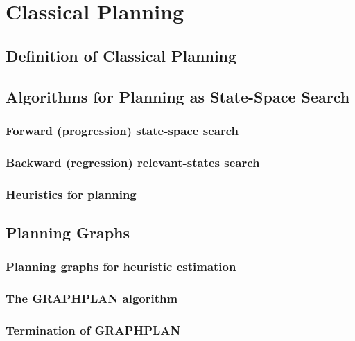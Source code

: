 \documentclass[11pt]{article}
\begin{document}

\newpage
\setcounter{section}{9}
\section{Classical Planning}

\subsection{Definition of Classical Planning}

\subsection{Algorithms for Planning as State-Space Search}

\subsubsection{Forward (progression) state-space search}

\subsubsection{Backward (regression) relevant-states search}

\subsubsection{Heuristics for planning}

\subsection{Planning Graphs}

\subsubsection{Planning graphs for heuristic estimation}

\subsubsection{The GRAPHPLAN algorithm}

\subsubsection{Termination of GRAPHPLAN}

\subsection{}
\end{document}

